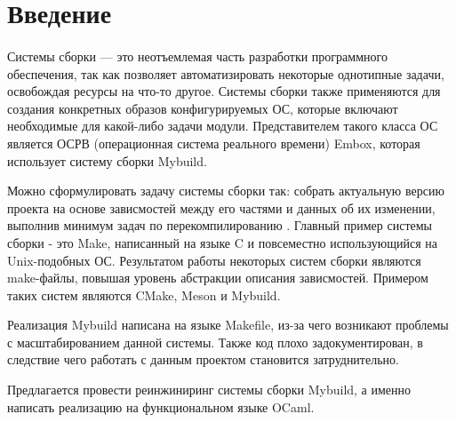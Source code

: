 
\section*{Введение}
\thispagestyle{withCompileDate}

\paragraph{} Системы сборки --- это неотъемлемая часть разработки программного обеспечения, так как позволяет автоматизировать некоторые однотипные задачи, освобождая ресурсы на что-то другое. Системы сборки также применяются для создания конкретных образов конфигурируемых ОС, которые включают необходимые для какой-либо задачи модули. Представителем такого класса ОС является ОСРВ (операционная система реального времени) Embox, которая использует систему сборки Mybuild.

Можно сформулировать задачу системы сборки так: собрать актуальную версию проекта на основе зависмостей между его частями и данных об их изменении, выполнив минимум задач по перекомпилированию \cite{mokhov2018build}. Главный пример системы сборки - это Make, написанный на языке C и повсеместно использующийся на Unix-подобных ОС. Результатом работы некоторых систем сборки являются make-файлы, повышая уровень абстракции описания зависмостей. Примером таких систем являются CMake, Meson и Mybuild.

Реализация Mybuild написана на языке Makefile, из-за чего возникают проблемы с масштабированием данной системы. Также код плохо задокументирован, в следствие чего работать с данным проектом становится затруднительно.

Предлагается провести реинжиниринг системы сборки Mybuild, а именно написать реализацию на функциональном языке OCaml.

